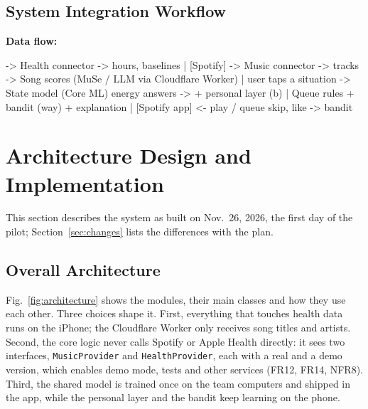\documentclass[conference]{IEEEtran}
\begin{document}
\subsection{System Integration Workflow}
\par\noindent\begin{minipage}{\columnwidth}
\textbf{Data flow:}
\begin{code}
 -> Health connector -> hours, baselines
                                          |
[Spotify] -> Music connector -> tracks -> Song scores
                     (MuSe / LLM via Cloudflare Worker)
                                          |
user taps a situation -> State model (Core ML)
          energy answers -> + personal layer (b)
                                          |
     Queue rules + bandit (way) + explanation
                                          |
[Spotify app] <- play / queue  skip, like -> bandit
\end{code}
\end{minipage}\par

\section{Architecture Design and Implementation}\label{sec:arch}
This section describes the system as built on Nov.\ 26, 2026, the first day of the pilot; Section~\ref{sec:changes} lists the differences with the plan.

\subsection{Overall Architecture}
Fig.~\ref{fig:architecture} shows the modules, their main classes and how they use each other. Three choices shape it. First, everything that touches health data runs on the iPhone; the Cloudflare Worker only receives song titles and artists. Second, the core logic never calls Spotify or Apple Health directly: it sees two interfaces, \texttt{MusicProvider} and \texttt{HealthProvider}, each with a real and a demo version, which enables demo mode, tests and other services (FR12, FR14, NFR8). Third, the shared model is trained once on the team computers and shipped in the app, while the personal layer and the bandit keep learning on the phone.
\end{document}
